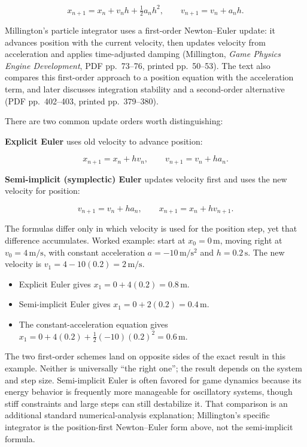 \[
x_{n+1}=x_n+v_n h+\tfrac12 a_n h^2, \qquad v_{n+1}=v_n+a_n h.
\]

Millington's particle integrator uses a first-order Newton--Euler update: it advances position with the current velocity, then updates velocity from acceleration and applies time-adjusted damping (Millington, \emph{Game Physics Engine Development}, PDF pp.~73--76, printed pp.~50--53). The text also compares this first-order approach to a position equation with the acceleration term, and later discusses integration stability and a second-order alternative (PDF pp.~402--403, printed pp.~379--380).

There are two common update orders worth distinguishing:

\textbf{Explicit Euler} uses old velocity to advance position:

\[
x_{n+1}=x_n+h v_n, \qquad v_{n+1}=v_n+h a_n.
\]

\textbf{Semi-implicit (symplectic) Euler} updates velocity first and uses the new velocity for position:

\[
v_{n+1}=v_n+h a_n, \qquad x_{n+1}=x_n+h v_{n+1}.
\]

The formulas differ only in which velocity is used for the position step, yet that difference accumulates. Worked example: start at \(x_0=0\,\mathrm{m}\), moving right at \(v_0=4\,\mathrm{m/s}\), with constant acceleration \(a=-10\,\mathrm{m/s^2}\) and \(h=0.2\,\mathrm{s}\). The new velocity is \(v_1=4-10(0.2)=2\,\mathrm{m/s}\).

\begin{itemize}
\tightlist
\item
  Explicit Euler gives \(x_1=0+4(0.2)=0.8\,\mathrm{m}\).
\item
  Semi-implicit Euler gives \(x_1=0+2(0.2)=0.4\,\mathrm{m}\).
\item
  The constant-acceleration equation gives \(x_1=0+4(0.2)+\frac12(-10)(0.2)^2=0.6\,\mathrm{m}\).
\end{itemize}

The two first-order schemes land on opposite sides of the exact result in this example. Neither is universally ``the right one''; the result depends on the system and step size. Semi-implicit Euler is often favored for game dynamics because its energy behavior is frequently more manageable for oscillatory systems, though stiff constraints and large steps can still destabilize it. That comparison is an additional standard numerical-analysis explanation; Millington's specific integrator is the position-first Newton--Euler form above, not the semi-implicit formula.

